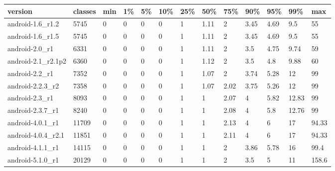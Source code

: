 \begin{tabular}{|l|l|l|l|l|l|l|l|l|l|l|l|l|}
\hline
version&classes&min&1\%&5\%&10\%&25\%&50\%&75\%&90\%&95\%&99\%&max\\
\hline
android-1.6\_r1.2&5745&0&0&0&0&1&1.11&2&3.45&4.69&9.5&55\\
\hline
android-1.6\_r1.5&5745&0&0&0&0&1&1.11&2&3.45&4.69&9.5&55\\
\hline
android-2.0\_r1&6331&0&0&0&0&1&1.11&2&3.5&4.75&9.74&59\\
\hline
android-2.1\_r2.1p2&6360&0&0&0&0&1&1.12&2&3.5&4.8&9.88&60\\
\hline
android-2.2\_r1&7352&0&0&0&0&1&1.07&2&3.74&5.28&12&99\\
\hline
android-2.2.3\_r2&7358&0&0&0&0&1&1.07&2.02&3.75&5.26&12&99\\
\hline
android-2.3\_r1&8093&0&0&0&0&1&1&2.07&4&5.82&12.83&99\\
\hline
android-2.3.7\_r1&8240&0&0&0&0&1&1&2.08&4&5.8&12.76&99\\
\hline
android-4.0.1\_r1&11709&0&0&0&0&1&1&2.13&4&6&17&94.33\\
\hline
android-4.0.4\_r2.1&11851&0&0&0&0&1&1&2.11&4&6&17&94.33\\
\hline
android-4.1.1\_r1&14115&0&0&0&0&1&1&2&3.86&5.78&16&99.4\\
\hline
android-5.1.0\_r1&20129&0&0&0&0&1&1&2&3.5&5&11&158.6\\
\hline
\end{tabular}
